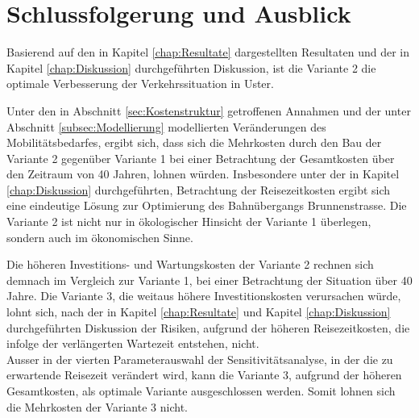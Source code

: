 %
%
%
%

\chapter{Schlussfolgerung und Ausblick}
\label{chap:Schlussfolgerung}


Basierend auf den in Kapitel \ref{chap:Resultate} dargestellten Resultaten und der in Kapitel \ref{chap:Diskussion} durchgeführten Diskussion, ist die Variante 2 die optimale Verbesserung der Verkehrssituation in Uster. 

Unter den in Abschnitt \ref{sec:Kostenstruktur} getroffenen Annahmen und der unter Abschnitt \ref{subsec:Modellierung} modellierten Veränderungen des Mobilitätsbedarfes, ergibt sich, dass sich die Mehrkosten durch den Bau der Variante 2 gegenüber Variante 1 bei einer Betrachtung der Gesamtkosten über den Zeitraum von 40 Jahren, lohnen würden. Insbesondere unter der in Kapitel \ref{chap:Diskussion} durchgeführten, Betrachtung der Reisezeitkosten ergibt sich eine eindeutige Lösung zur Optimierung des Bahnübergangs Brunnenstrasse. Die Variante 2 ist nicht nur in ökologischer Hinsicht der Variante 1 überlegen, sondern auch im ökonomischen Sinne.

Die höheren Investitions- und Wartungskosten der Variante 2 rechnen sich demnach im Vergleich zur Variante 1, bei einer Betrachtung der Situation über 40 Jahre. Die Variante 3, die weitaus höhere Investitionskosten verursachen würde, lohnt sich, nach der in Kapitel \ref{chap:Resultate} und Kapitel \ref{chap:Diskussion} durchgeführten Diskussion der Risiken, aufgrund der höheren Reisezeitkosten, die infolge der verlängerten Wartezeit entstehen, nicht. \\
Ausser in der vierten Parameterauswahl der Sensitivitätsanalyse, in der die zu erwartende Reisezeit verändert wird, kann die Variante 3, aufgrund der höheren Gesamtkosten, als optimale Variante ausgeschlossen werden. Somit lohnen sich die Mehrkosten der Variante 3 nicht.

